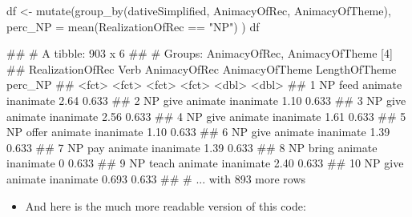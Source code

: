 \documentclass[
]{book}
\newenvironment{Shaded}{\begin{snugshade}}{\end{snugshade}}
\newcommand{\AttributeTok}[1]{\textcolor[rgb]{0.77,0.63,0.00}{#1}}
\newcommand{\FunctionTok}[1]{\textcolor[rgb]{0.00,0.00,0.00}{#1}}
\newcommand{\NormalTok}[1]{#1}
\newcommand{\OtherTok}[1]{\textcolor[rgb]{0.56,0.35,0.01}{#1}}
\newcommand{\SpecialCharTok}[1]{\textcolor[rgb]{0.00,0.00,0.00}{#1}}
\newcommand{\StringTok}[1]{\textcolor[rgb]{0.31,0.60,0.02}{#1}}
\providecommand{\tightlist}{%
  \setlength{\itemsep}{0pt}\setlength{\parskip}{0pt}}
\begin{document}
\begin{Shaded}
\begin{Highlighting}[]
\NormalTok{df }\OtherTok{\textless{}{-}} \FunctionTok{mutate}\NormalTok{(}\FunctionTok{group\_by}\NormalTok{(dativeSimplified, AnimacyOfRec, AnimacyOfTheme), }
                  \AttributeTok{perc\_NP =} \FunctionTok{mean}\NormalTok{(RealizationOfRec }\SpecialCharTok{==} \StringTok{"NP"}\NormalTok{) )}
\NormalTok{df}
\end{Highlighting}
\end{Shaded}

\begin{Shaded}
\begin{Highlighting}[]
\NormalTok{\#\# \# A tibble: 903 x 6}
\NormalTok{\#\# \# Groups:   AnimacyOfRec, AnimacyOfTheme [4]}
\NormalTok{\#\#    RealizationOfRec Verb  AnimacyOfRec AnimacyOfTheme LengthOfTheme perc\_NP}
\NormalTok{\#\#    \textless{}fct\textgreater{}            \textless{}fct\textgreater{} \textless{}fct\textgreater{}        \textless{}fct\textgreater{}                  \textless{}dbl\textgreater{}   \textless{}dbl\textgreater{}}
\NormalTok{\#\#  1 NP               feed  animate      inanimate              2.64    0.633}
\NormalTok{\#\#  2 NP               give  animate      inanimate              1.10    0.633}
\NormalTok{\#\#  3 NP               give  animate      inanimate              2.56    0.633}
\NormalTok{\#\#  4 NP               give  animate      inanimate              1.61    0.633}
\NormalTok{\#\#  5 NP               offer animate      inanimate              1.10    0.633}
\NormalTok{\#\#  6 NP               give  animate      inanimate              1.39    0.633}
\NormalTok{\#\#  7 NP               pay   animate      inanimate              1.39    0.633}
\NormalTok{\#\#  8 NP               bring animate      inanimate              0       0.633}
\NormalTok{\#\#  9 NP               teach animate      inanimate              2.40    0.633}
\NormalTok{\#\# 10 NP               give  animate      inanimate              0.693   0.633}
\NormalTok{\#\# \# ... with 893 more rows}
\end{Highlighting}
\end{Shaded}

\begin{itemize}
\tightlist
\item
  And here is the much more readable version of this code:
\end{itemize}
\end{document}
